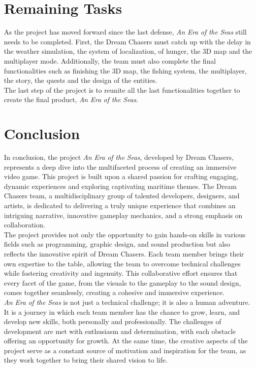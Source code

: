 \documentclass{article}
\begin{document}
\newpage
\section{Remaining Tasks}\hfill

As the project has moved forward since the last defense, \textit{An Era of the Seas} still needs to be completed. First, the Dream Chasers must catch up with the delay in the weather simulation, the system of localization, of hunger, the 3D map and the multiplayer mode. Additionally, the team must also complete the final functionalities such as finishing the 3D map, the fishing system, the multiplayer, the story, the quests and the design of the entities.\\

The last step of the project is to reunite all the last functionalities together to create the final product, \textit{An Era of the Seas}.


\newpage
\section{Conclusion}\hfill

In conclusion, the project \textit{An Era of the Seas}, developed by Dream Chasers, represents a deep dive into the multifaceted process of creating an immersive video game. This project is built upon a shared passion for crafting engaging, dynamic experiences and exploring captivating maritime themes. The Dream Chasers team, a multidisciplinary group of talented developers, designers, and artists, is dedicated to delivering a truly unique experience that combines an intriguing narrative, innovative gameplay mechanics, and a strong emphasis on collaboration.\\

The project provides not only the opportunity to gain hands-on skills in various fields such as programming, graphic design, and sound production but also reflects the innovative spirit of Dream Chasers. Each team member brings their own expertise to the table, allowing the team to overcome technical challenges while fostering creativity and ingenuity. This collaborative effort ensures that every facet of the game, from the visuals to the gameplay to the sound design, comes together seamlessly, creating a cohesive and immersive experience.\\

\textit{An Era of the Seas} is not just a technical challenge; it is also a human adventure. It is a journey in which each team member has the chance to grow, learn, and develop new skills, both personally and professionally. The challenges of development are met with enthusiasm and determination, with each obstacle offering an opportunity for growth. At the same time, the creative aspects of the project serve as a constant source of motivation and inspiration for the team, as they work together to bring their shared vision to life.\\
\end{document}
